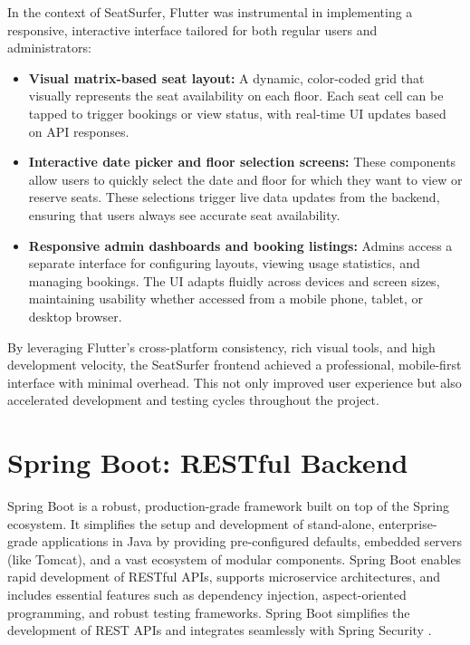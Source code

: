\documentclass[12pt,a4paper]{report} %
\begin{document}
In the context of SeatSurfer, Flutter was instrumental in implementing a responsive, interactive interface tailored for both regular users and administrators:

\begin{itemize}
\item \textbf{Visual matrix-based seat layout:} A dynamic, color-coded grid that visually represents the seat availability on each floor. Each seat cell can be tapped to trigger bookings or view status, with real-time UI updates based on API responses.
\item \textbf{Interactive date picker and floor selection screens:} These components allow users to quickly select the date and floor for which they want to view or reserve seats. These selections trigger live data updates from the backend, ensuring that users always see accurate seat availability.
\item \textbf{Responsive admin dashboards and booking listings:} Admins access a separate interface for configuring layouts, viewing usage statistics, and managing bookings. The UI adapts fluidly across devices and screen sizes, maintaining usability whether accessed from a mobile phone, tablet, or desktop browser.
\end{itemize}

By leveraging Flutter's cross-platform consistency, rich visual tools, and high development velocity, the SeatSurfer frontend achieved a professional, mobile-first interface with minimal overhead. This not only improved user experience but also accelerated development and testing cycles throughout the project.

\section{Spring Boot: RESTful Backend}

Spring Boot is a robust, production-grade framework built on top of the Spring ecosystem. It simplifies the setup and development of stand-alone, enterprise-grade applications in Java by providing pre-configured defaults, embedded servers (like Tomcat), and a vast ecosystem of modular components. Spring Boot enables rapid development of RESTful APIs, supports microservice architectures, and includes essential features such as dependency injection, aspect-oriented programming, and robust testing frameworks. Spring Boot simplifies the development of REST APIs and integrates seamlessly with Spring Security \cite{baeldung2023springapi}.
\end{document}
